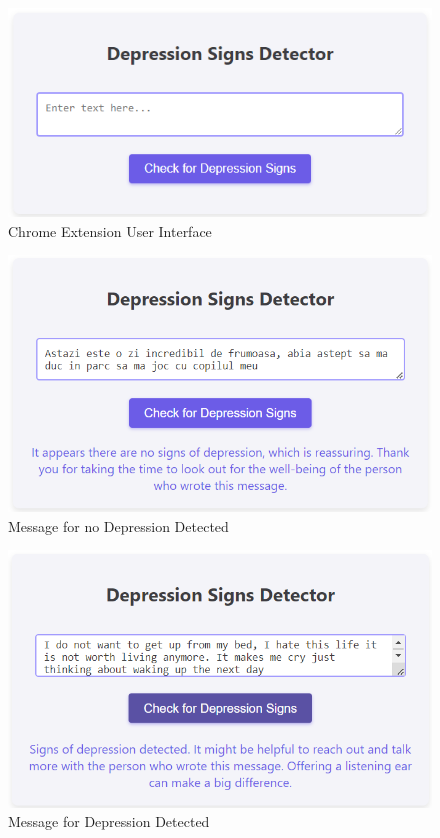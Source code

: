 \begin{figure}[htbp]
	\centering
		\includegraphics[scale=0.7]{LaTeX Bachelor Thesis Depression Signs Detection/figures/interface.png}
	\caption{Chrome Extension User Interface}
	\label{interface}
\end{figure}

\begin{figure}[htbp]
	\centering
		\includegraphics[scale=0.7]{LaTeX Bachelor Thesis Depression Signs Detection/figures/interfaceNoDepression.png}
	\caption{Message for no Depression Detected}
	\label{interfaceNoDepression}
\end{figure}

\begin{figure}[htbp]
	\centering
		\includegraphics[scale=0.7]{LaTeX Bachelor Thesis Depression Signs Detection/figures/interfaceDepression.png}
	\caption{Message for Depression Detected}
	\label{interfaceDepression}
\end{figure}








